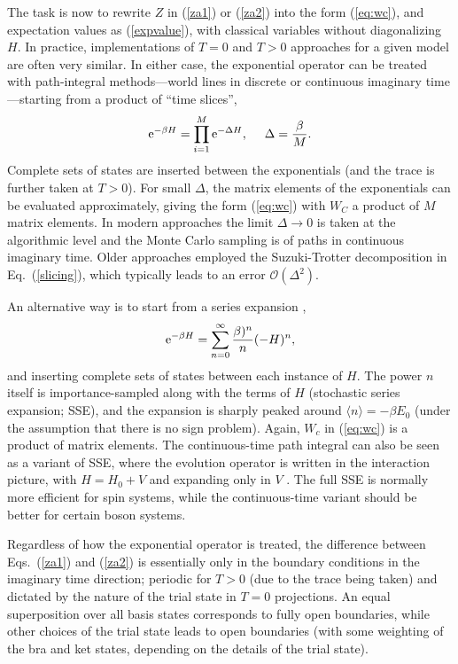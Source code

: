 \documentclass[range]{ar2e}
\begin{document}
The task is now to rewrite $Z$ in (\ref{za1}) or (\ref{za2}) into the form (\ref{eq:wc}), and expectation values as (\ref{expvalue}), with classical variables 
without diagonalizing $H$. In practice, implementations of $T=0$ and $T>0$ approaches for a given model are often very similar. In either case, the exponential 
operator can be treated with path-integral methods---world lines in discrete \cite{Suzuki77,Hirsch82} or continuous \cite{Beard96,Prokofev96,Prokofev98} 
imaginary time---starting from a product of ``time slices'',
\begin{equation}
{\rm e}^{-\beta H}= \prod_{i=1}^M {\rm e}^{-\Delta H},~~~~ \Delta=\frac{\beta}{M}.
\label{slicing}
\end{equation}
Complete sets of states are inserted between the exponentials (and the trace is further taken at $T>0$). For small $\Delta$, the
matrix elements of the exponentials can be evaluated approximately, giving the form (\ref{eq:wc}) with $W_C$ a product of $M$ matrix elements. 
In modern approaches the limit $\Delta \to 0$ is taken at the algorithmic level \cite{Prokofev96,WormA,Beard96} and the Monte Carlo sampling is of 
paths in continuous imaginary time. Older approaches employed the Suzuki-Trotter decomposition \cite{Suzuki76} in Eq.~(\ref{slicing}), which 
typically leads to an error $\mathcal{O}(\Delta^2)$.

An alternative way is to start from a series expansion \cite{Handscomb62,Sandvik91},
\begin{equation}
{\rm e}^{-\beta H}= \sum_{n=0}^\infty \frac{\beta)^n}{n}(-H)^n,
\label{series}
\end{equation}
and inserting complete sets of states between each instance of $H$. The power $n$ itself is importance-sampled along with the terms of $H$ 
(stochastic series expansion; SSE), and the expansion is sharply peaked around $\langle n\rangle = -\beta E_0$ (under the assumption that there 
is no sign problem). Again, $W_c$ in (\ref{eq:wc}) is a product of matrix elements. The continuous-time path integral can also be seen as a variant 
of SSE, where the evolution operator is written in the interaction picture, with $H=H_0+V$ and expanding only in $V$ \cite{Prokofev96,Sandvik97a}. 
The full SSE is normally more efficient for spin systems, while the continuous-time variant should be better for certain boson systems.

Regardless of how the exponential operator is treated, the difference between Eqs.~(\ref{za1}) and (\ref{za2}) is essentially only in the boundary 
conditions in the imaginary time direction; periodic for $T>0$ (due to the trace being taken) and dictated by the nature of the trial state in $T=0$ 
projections. An equal superposition over all basis states corresponds to fully open boundaries, while other choices of the trial state leads to open 
boundaries (with some weighting of the bra and ket states, depending on the details of the trial state). 
\end{document}
